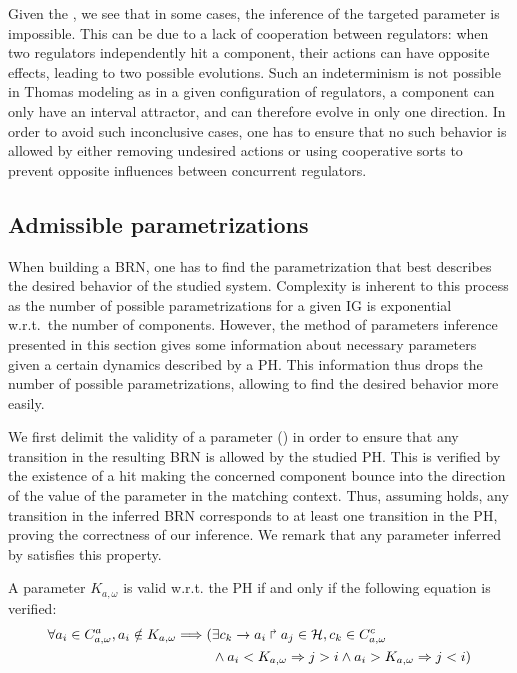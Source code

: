 Given the , we see that in some cases, the inference of the targeted parameter is impossible.
This can be due to a lack of cooperation between regulators:
when two regulators independently hit a component, their actions can have opposite effects, leading to two possible evolutions.
Such an indeterminism is not possible in Thomas modeling as in a given configuration of regulators,
a component can only have an interval attractor, and can therefore evolve in only one direction.
In order to avoid such inconclusive cases, one has to ensure that no such behavior is allowed by
either removing undesired actions or using cooperative sorts to prevent opposite influences between
concurrent regulators.

\subsection{Admissible parametrizations}\label{ssec:admissible-K}

When building a BRN, one has to find the parametrization that best describes the desired behavior of the studied system.
Complexity is inherent to this process as the number of possible parametrizations for a given IG is exponential w.r.t.~the number of components.
However, the method of parameters inference presented in this section gives some information about necessary parameters given a certain dynamics described by a PH.
This information thus drops the number of possible parametrizations, allowing to find the desired behavior more easily.

We first delimit the validity of a parameter () in order to ensure that any
transition in the resulting BRN is allowed by the studied PH.
This is verified by the existence of a hit making the concerned component bounce into the direction
of the value of the parameter in the matching context.
Thus, assuming  holds, any transition in the inferred BRN corresponds to at least
one transition in the PH, proving the correctness of our inference.
We remark that any parameter inferred by  satisfies this property.

\begin{property}\label{pro:K-valid}
A parameter $K_{a,\omega}$ is valid w.r.t. the PH if and only if the following equation is verified:
\begin{align*}
  \forall a_i\in C^a_{a,\omega}, a_i \notin K_{a,\omega} \Longrightarrow
    (& \exists c_k\rightarrow a_i\Rsh a_j\in\mathcal{H}, c_k \in C^c_{a,\omega} \\
     & \wedge a_i < K_{a,\omega} \Rightarrow j > i \wedge  a_i > K_{a,\omega} \Rightarrow j <i )
\end{align*}
\end{property}

